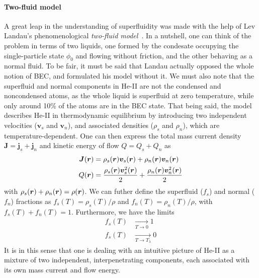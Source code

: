 \paragraph{Two-fluid model}
A great leap in the understanding of superfluidity was made with the
help of Lev Landau's phenomenological \textit{two-fluid
  model}~\cite{Landau:111625}. In a nutshell, one can think of the
problem in terms of two liquids, one formed by the condesate occupying
the single-particle state $\phi_0$ and flowing without friction, and
the other behaving as a normal fluid. To be fair, it must be said that
Landau actually opposed the whole notion of BEC, and formulated his
model without it. We must also note that the superfluid and normal
components in He-II are not the condensed and noncondensed atoms, as
the whole liquid is superfluid at zero temperature, while only around
10\% of the atoms are in the BEC state. That being said, the model
describes He-II in thermodynamic equilibrium by introducing two
independent velocities ($\bm{v}_s$ and $\bm{v}_n$), and associated
densities ($\rho_s$ and $\rho_n$), which are
temperature-dependent. One can then express the total mass current
density $\bm{J} = \bm{j}_s + \bm{j}_n$ and kinetic energy of flow
$Q = Q_s + Q_n$ as~\cite{leggett2006quantum}
\begin{align}
  \bm{J}(\bm{r}) & = \rho_s(\bm{r})\bm{v}_s(\bm{r}) + \rho_n(\bm{r})\bm{v}_n(\bm{r})\\
  Q(\bm{r}) & = \frac{\rho_s(\bm{r})\bm{v}_s^2(\bm{r})}{2} + \frac{\rho_n(\bm{r})\bm{v}_n^2(\bm{r})}{2}
\end{align}
with $\rho_s(\bm{r}) + \rho_n(\bm{r}) = \rho(\bm{r})$. We can futher define the
superfluid ($f_s$) and normal ($f_n$) fractions as
$f_s(T) = \rho_s(T)/\rho$ and $f_n(T) = \rho_n(T)/\rho$, with
$f_s(T) + f_n(T) = 1$. Furthermore, we have the limits
%
\begin{align}
  f_s(T) &\xrightarrow[T \rightarrow 0]{} 1\\
  f_s(T) &\xrightarrow[T \rightarrow T_{\lambda}]{} 0
\end{align}
%
It is in this sense that one is dealing with an intuitive picture of
He-II as a mixture of two independent, interpenetrating components,
each associated with its own mass current and flow energy.


